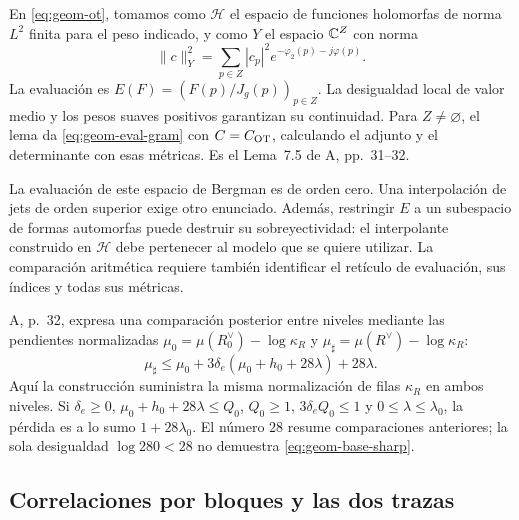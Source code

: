 En \eqref{eq:geom-ot}, tomamos como $\mathcal H$ el espacio
de funciones holomorfas de norma $L^2$ finita para el peso
indicado, y como $Y$ el espacio $\mathbb{C}^Z$ con norma
\[
 \|c\|_Y^2=\sum_{p\in Z}|c_p|^2e^{-\varphi_2(p)-j\varphi(p)}.
\]
La evaluación es $E(F)=(F(p)/J_g(p))_{p\in Z}$.
La desigualdad local de valor medio y los pesos suaves positivos
garantizan su continuidad. Para $Z\ne\varnothing$, el lema
da \eqref{eq:geom-eval-gram} con $C=C_{\rm OT}$, calculando
el adjunto y el determinante con esas métricas.
Es el Lema~7.5 de A, pp.~31--32.

La evaluación de este espacio de Bergman es de orden cero.
Una interpolación de jets de orden superior exige otro enunciado.
Además, restringir $E$ a un subespacio de formas automorfas
puede destruir su sobreyectividad: el interpolante construido
en $\mathcal H$ debe pertenecer al modelo que se quiere utilizar.
La comparación aritmética requiere también identificar
el retículo de evaluación, sus índices y todas sus métricas.

A, p.~32, expresa una comparación posterior entre niveles
mediante las pendientes normalizadas
$\mu_0=\mu(R_0^\vee)-\log\kappa_R$ y
$\mu_\sharp=\mu(R^\vee)-\log\kappa_R$:
\begin{equation}
 \mu_\sharp\le
 \mu_0+3\delta_e(\mu_0+h_0+28\lambda)+28\lambda.
 \label{eq:geom-base-sharp}
\end{equation}
Aquí la construcción suministra la misma normalización de
filas $\kappa_R$ en ambos niveles. Si
$\delta_e\ge0$, $\mu_0+h_0+28\lambda\le Q_0$,
$Q_0\ge1$, $3\delta_eQ_0\le1$ y
$0\le\lambda\le\lambda_0$, la pérdida es a lo sumo
$1+28\lambda_0$.
El número $28$ resume comparaciones anteriores; la sola
desigualdad $\log280<28$ no demuestra
\eqref{eq:geom-base-sharp}.

\subsection{Correlaciones por bloques y las dos trazas}

